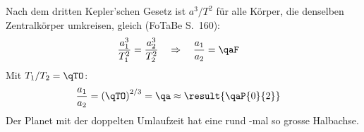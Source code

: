 Nach dem dritten Kepler'schen Gesetz ist $a^3/T^2$ für alle Körper, die denselben Zentralkörper umkreisen, gleich (FoTaBe S.~160):
\begin{align}
 \frac{a_1^3}{T_1^2} &= \frac{a_2^3}{T_2^2}
 \quad\Rightarrow\quad \frac{a_1}{a_2} = \qaF
\end{align}
Mit $T_1/T_2 = \qTO$:
\begin{align}
 \frac{a_1}{a_2} &= \left(\qTO\right)^{2/3} = \qa \approx \result{\qaP{0}{2}}
\end{align}
Der Planet mit der doppelten Umlaufzeit hat eine rund -mal so grosse Halbachse.
